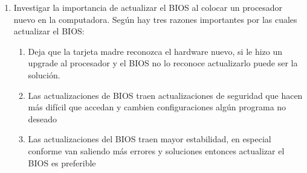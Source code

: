 \documentclass[stu, 12pt, letterpaper, donotrepeattitle, floatsintext, natbib, helv]{apa7}
\begin{document}
\begin{enumerate}
    \begin{enumerate}
        \item Verificar si la CPU y la tarjeta madre pueden hacer overclock
        \item Limpiar la computadora (recomiendan usar un brazalete antiestática)
        \item Verificar la temperatura actual de la computadora (importante saber que normalmente las computadoras trabajan duro con una temperatura de 170\degree F o 77\degree C, pero que si al estar en un estado IDLE está por encima de 175\degree F o 79\degree C el overclock puede dañar el CPU)
        \item Verificar el uso del CPU (se puede usar task manager en windows), si constantemente está usando 100\% entonces no es recomendable overclock
        \item Benchmark para ver el rendimiento de la CPU (recomiendan CineBench en el video) esto da un buen estimado de como se comporta y se usara para comparar los resultados después del resultado.
        \item Apagar la computadora
        \item Volver a prender y entrar al BIOS
        \item Navegar al menú del procesador
        \item Localizar el multiplicador del CPU
        \item Incrementar el multiplicador por cuanto quiera
        \item Repetir los pasos e-j hasta obtener resultado que prefiere en el benchmarks, si la computadora le da un pantallazo azul o negro vuelva a entrar al BIOS y baje el multiplicador.
        \item En el BIOS cambiar el voltaje
        \item Repetir el paso e - l hasta obtener resultados preferido.
    \end{enumerate}
    \item Investigar la importancia de actualizar el BIOS al colocar un procesador nuevo en la computadora. Según \cite{updateBIOS} hay tres razones importantes por las cuales actualizar el BIOS:
    \begin{enumerate}
        \item Deja que la tarjeta madre reconozca el hardware nuevo, si le hizo un upgrade al procesador y el BIOS no lo reconoce actualizarlo puede ser la solución.
        \item Las actualizaciones de BIOS traen actualizaciones de seguridad que hacen más difícil que accedan y cambien configuraciones algún programa no deseado
        \item Las actualizaciones del BIOS traen mayor estabilidad, en especial conforme van saliendo más errores y soluciones entonces actualizar el BIOS es preferible
    \end{enumerate}
\end{enumerate}
\end{document}
